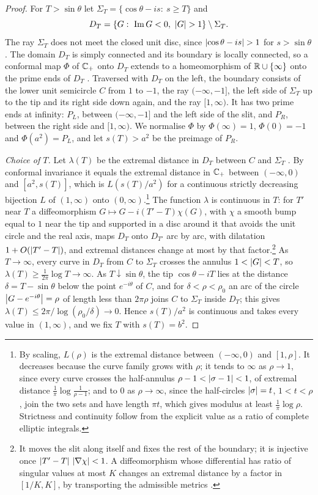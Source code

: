 \begin{proof}
For $T>\sin\theta$ let $\Sigma_T=\{\cos\theta-is:\ s\ge T\}$ and
\[
D_T=\{G:\ \Im G<0,\ \abs G>1\}\setminus\Sigma_T .
\]
The ray $\Sigma_T$ does not meet the closed unit disc, since
$\abs{\cos\theta-is}>1$ for $s>\sin\theta$. The domain $D_T$ is simply connected
and its boundary is locally connected, so a conformal map $\Phi$ of $\mathbb C_{+}$
onto $D_T$ extends to a homeomorphism of $\mathbb R\cup\{\infty\}$ onto the prime ends
of $D_T$ \cite[Ch.~2]{pommerenke}. Traversed with $D_T$ on the left, the
boundary consists of the lower unit semicircle $C$ from $1$ to $-1$, the ray
$(-\infty,-1]$, the left side of $\Sigma_T$ up to the tip and its right side
down again, and the ray $[1,\infty)$. It has two prime ends at infinity:
$P_L$, between $(-\infty,-1]$ and the left side of the slit, and $P_R$,
between the right side and $[1,\infty)$. We normalise $\Phi$ by $\Phi(\infty)=1$,
$\Phi(0)=-1$ and $\Phi(a^2)=P_L$, and let $s(T)>a^2$ be the preimage of $P_R$.

\emph{Choice of $T$.} Let $\lambda(T)$ be the extremal distance in $D_T$
between $C$ and $\Sigma_T$ \cite[Ch.~4]{ahlforsci}. By conformal invariance it
equals the extremal distance in $\mathbb C_{+}$ between $(-\infty,0)$ and $[a^2,s(T)]$,
which is $L(s(T)/a^2)$ for a continuous strictly decreasing bijection $L$ of
$(1,\infty)$ onto $(0,\infty)$.\footnote{By scaling, $L(\rho)$ is the extremal
distance between $(-\infty,0)$ and $[1,\rho]$. It decreases because the curve
family grows with $\rho$; it tends to $\infty$ as $\rho\to1$, since every curve
crosses the half-annulus $\rho-1<\left|\sigma-1\right|<1$, of extremal distance
$\frac1\pi\log\frac1{\rho-1}$; and to $0$ as $\rho\to\infty$, since the half-circles
$\left|\sigma\right|=t$, $1<t<\rho$, join the two sets and have length $\pi t$, which gives
modulus at least $\frac1\pi\log\rho$. Strictness and continuity follow from the
explicit value as a ratio of complete elliptic integrals.} The function
$\lambda$ is continuous in $T$: for $T'$ near $T$ a diffeomorphism
$G\mapsto G-i(T'-T)\chi(G)$, with $\chi$ a smooth bump equal to $1$ near the
tip and supported in a disc around it that avoids the unit circle and the
real axis, maps $D_T$ onto $D_{T'}$ arc by arc, with dilatation
$1+O(\left|T'-T\right|)$, and extremal distances change at most by that
factor.\footnote{It moves the slit along itself and fixes the rest of the
boundary; it is injective once $\left|T'-T\right|\,\left|\nabla\chi\right|<1$. A
diffeomorphism whose differential has ratio of singular values at most $K$
changes an extremal distance by a factor in $[1/K,K]$, by transporting the
admissible metrics \cite[Ch.~4]{ahlforsci}.} As $T\to\infty$, every curve in
$D_T$ from $C$ to $\Sigma_T$ crosses the annulus $1<\left|G\right|<T$, so
$\lambda(T)\ge\frac1{2\pi}\log T\to\infty$. As $T\downarrow\sin\theta$, the tip
$\cos\theta-iT$ lies at the distance $\delta=T-\sin\theta$ below the point $e^{-i\theta}$
of $C$, and for $\delta<\rho<\rho_0$ an arc of the circle $\left|G-e^{-i\theta}\right|=\rho$
of length less than $2\pi\rho$ joins $C$ to $\Sigma_T$ inside $D_T$; this gives
$\lambda(T)\le2\pi/\log(\rho_0/\delta)\to0$. Hence $s(T)/a^2$ is continuous and
takes every value in $(1,\infty)$, and we fix $T$ with $s(T)=b^2$.


\end{proof}
